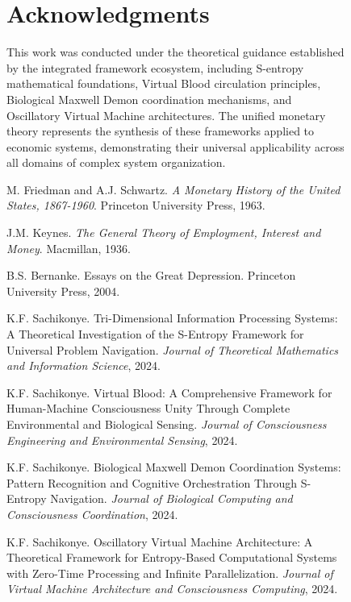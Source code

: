 \begin{figure}[h]
    \section*{Acknowledgments}
    
    This work was conducted under the theoretical guidance established by the integrated framework ecosystem, including S-entropy mathematical foundations, Virtual Blood circulation principles, Biological Maxwell Demon coordination mechanisms, and Oscillatory Virtual Machine architectures. The unified monetary theory represents the synthesis of these frameworks applied to economic systems, demonstrating their universal applicability across all domains of complex system organization.
    
    
    \begin{thebibliography}{99}
    
    M. Friedman and A.J. Schwartz.
    \textit{A Monetary History of the United States, 1867-1960}.
    Princeton University Press, 1963.
    
    J.M. Keynes.
    \textit{The General Theory of Employment, Interest and Money}.
    Macmillan, 1936.
    
    B.S. Bernanke.
    Essays on the Great Depression.
    Princeton University Press, 2004.
    
    K.F. Sachikonye.
    Tri-Dimensional Information Processing Systems: A Theoretical Investigation of the S-Entropy Framework for Universal Problem Navigation.
    \textit{Journal of Theoretical Mathematics and Information Science}, 2024.
    
    K.F. Sachikonye.
    Virtual Blood: A Comprehensive Framework for Human-Machine Consciousness Unity Through Complete Environmental and Biological Sensing.
    \textit{Journal of Consciousness Engineering and Environmental Sensing}, 2024.
    
    K.F. Sachikonye.
    Biological Maxwell Demon Coordination Systems: Pattern Recognition and Cognitive Orchestration Through S-Entropy Navigation.
    \textit{Journal of Biological Computing and Consciousness Coordination}, 2024.
    
    K.F. Sachikonye.
    Oscillatory Virtual Machine Architecture: A Theoretical Framework for Entropy-Based Computational Systems with Zero-Time Processing and Infinite Parallelization.
    \textit{Journal of Virtual Machine Architecture and Consciousness Computing}, 2024.
    

\end{thebibliography}
\end{figure}
